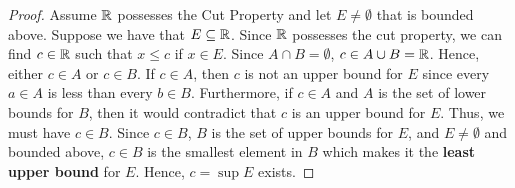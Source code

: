 \begin{enumerate}
        \begin{proof}
            Assume \( \mathbb{R} \) possesses the Cut Property and let \( E \neq \emptyset \) that is bounded above. Suppose we have that \( E \subseteq \mathbb{R} \). Since \( \mathbb{R} \) possesses the cut property, we can find \( c \in \mathbb{R} \) such that \( x \leq c \) if \( x \in E \). Since \( A \cap B = \emptyset \), \( c \in A \cup B = \mathbb{R} \). Hence, either \( c \in A \) or \( c \in B \). If \(c \in A \), then \( c \) is not an upper bound for \( E \) since every \(a \in A  \) is less than every \( b \in B \). Furthermore, if \( c \in A \) and \( A \) is the set of lower bounds for \( B \), then it would contradict that \( c \) is an upper bound for \( E \). Thus, we must have \( c \in B \). Since \( c \in B \), \( B \) is the set of upper bounds for \( E \), and \( E \neq \emptyset \) and bounded above, \( c \in B \) is the smallest element in \( B \) which makes it the \textbf{least upper bound} for \( E \). Hence, \( c = \sup E \) exists.
        \end{proof} 
        

    
\end{enumerate}














% 




